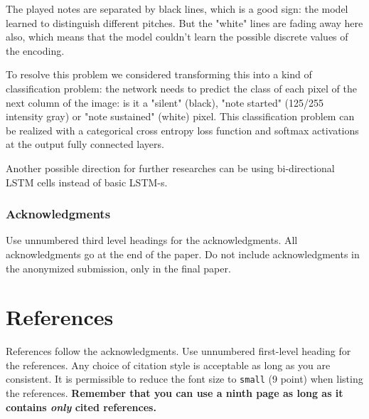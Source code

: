 \documentclass{article}
\begin{document}
The played notes are separated by black lines, which is a good sign: the model learned to distinguish different pitches. But the "white" lines are fading away here also, which means that the model couldn't learn the possible discrete values of the encoding. 

To resolve this problem we considered transforming this into a kind of classification problem: the network needs to predict the class of each pixel of the next column of the image: is it a "silent" (black), "note started" (125/255 intensity gray) or "note sustained" (white) pixel. This classification problem can be realized with a categorical cross entropy loss function and softmax activations at the output fully connected layers. 

Another possible direction for further researches can be using bi-directional LSTM cells instead of basic LSTM-s. 

\subsubsection*{Acknowledgments}

Use unnumbered third level headings for the acknowledgments. All
acknowledgments go at the end of the paper. Do not include
acknowledgments in the anonymized submission, only in the final paper.

\section*{References}

References follow the acknowledgments. Use unnumbered first-level
heading for the references. Any choice of citation style is acceptable
as long as you are consistent. It is permissible to reduce the font
size to \verb+small+ (9 point) when listing the references. {\bf
  Remember that you can use a ninth page as long as it contains
  \emph{only} cited references.}
\medskip

\small

\newpage

\tableofcontents
\newpage
\end{document}
